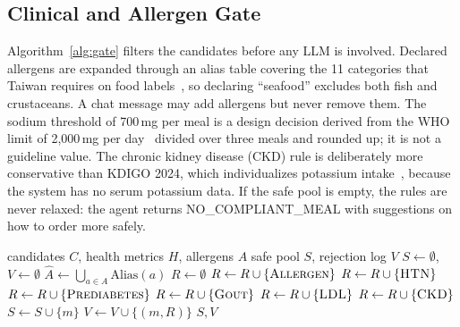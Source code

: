 \subsection{Clinical and Allergen Gate}
Algorithm~\ref{alg:gate} filters the candidates before any LLM is involved.
Declared allergens are expanded through an alias table covering the 11
categories that Taiwan requires on food labels~\cite{mohw2018allergen}, so
declaring ``seafood'' excludes both fish and crustaceans. A chat message may add
allergens but never remove them. The sodium threshold of 700\,mg per meal is a
design decision derived from the WHO limit of 2{,}000\,mg per
day~\cite{who2025hypertension} divided over three meals and rounded up; it is
not a guideline value. The chronic kidney disease (CKD) rule is deliberately
more conservative than KDIGO 2024, which individualizes potassium
intake~\cite{kdigo2024ckd}, because the system has no serum potassium data. If
the safe pool is empty, the rules are never relaxed: the agent returns
NO\_COMPLIANT\_MEAL with suggestions on how to order more safely.

\begin{algorithm}[t]
    \caption{Clinical and Allergen Hard-Constraint Gate
        (Na in mg; sugar and saturated fat in g)}
    \label{alg:gate}
    \begin{algorithmic}[1]
        \Require candidates $C$, health metrics $H$, allergens $A$
        \Ensure safe pool $S$, rejection log $V$
        \State $S \gets \emptyset$, $V \gets \emptyset$
        \State $\hat{A} \gets \bigcup_{a \in A} \mathrm{Alias}(a)$
            \State $R \gets \emptyset$
                \State $R \gets R \cup \{\textsc{Allergen}\}$
            \EndIf
                \State $R \gets R \cup \{\textsc{HTN}\}$
            \EndIf
                \State $R \gets R \cup \{\textsc{Prediabetes}\}$
            \EndIf
                \State $R \gets R \cup \{\textsc{Gout}\}$
            \EndIf
                \State $R \gets R \cup \{\textsc{LDL}\}$
            \EndIf
                \State $R \gets R \cup \{\textsc{CKD}\}$
            \EndIf
                \State $S \gets S \cup \{m\}$
            \Else
                \State $V \gets V \cup \{(m, R)\}$
            \EndIf
        \EndFor
        \State \Return $S, V$
    \end{algorithmic}
\end{algorithm}

